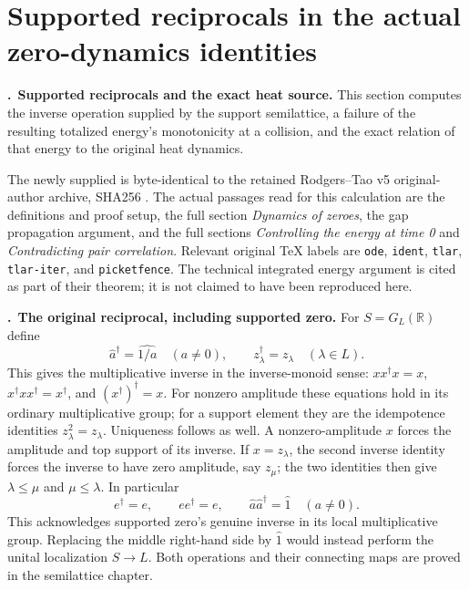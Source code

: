 \section{Supported reciprocals in the actual zero-dynamics identities}
\label{sec:rd}
\newcommand{\RD}{\par\medskip\noindent\textbf{\therd.}\ }

\RD\textbf{Supported reciprocals and the exact heat source.}
This section computes the inverse operation supplied by the support
semilattice, a failure of the resulting totalized energy's monotonicity
at a collision, and the exact relation of that energy to the original
heat dynamics.

The newly supplied  is byte-identical
to the retained Rodgers--Tao v5 original-author archive, SHA256
.
The actual passages read for this calculation are the definitions and
proof setup, the full section \emph{Dynamics of zeroes}, the gap
propagation argument, and the full sections \emph{Controlling the energy
at time 0} and \emph{Contradicting pair correlation}. Relevant original
TeX labels are \texttt{ode}, \texttt{ident}, \texttt{tlar},
\texttt{tlar-iter}, and \texttt{picketfence}. The technical integrated
energy argument is cited as part of their theorem; it is not claimed
to have been reproduced here.

\RD\textbf{The original reciprocal, including supported zero.}
For $S=G_L(\mathbb R)$ define
\[
 \widehat a^{\dagger}=\widehat{1/a}\quad(a\ne0),
 \qquad z_\lambda^{\dagger}=z_\lambda\quad(\lambda\in L).
\]
This gives the multiplicative inverse in the inverse-monoid sense:
$xx^\dagger x=x$, $x^\dagger xx^\dagger=x^\dagger$, and
$(x^\dagger)^\dagger=x$. For nonzero amplitude these equations hold
in its ordinary multiplicative group; for a support element they are
the idempotence identities $z_\lambda^2=z_\lambda$. Uniqueness follows
as well. A nonzero-amplitude $x$ forces the amplitude and top support
of its inverse. If $x=z_\lambda$, the second inverse identity forces
the inverse to have zero amplitude, say $z_\mu$; the two identities
then give $\lambda\le\mu$ and $\mu\le\lambda$.
In particular
\[
 e^\dagger=e,\qquad ee^\dagger=e,\qquad
 \widehat a\widehat a^\dagger=\widehat1\quad(a\ne0).
\]
This acknowledges supported zero's genuine inverse in its local
multiplicative group. Replacing the middle right-hand side by
$\widehat1$ would instead perform the unital localization $S\to L$.
Both operations and their connecting maps are proved in the
semilattice chapter.

